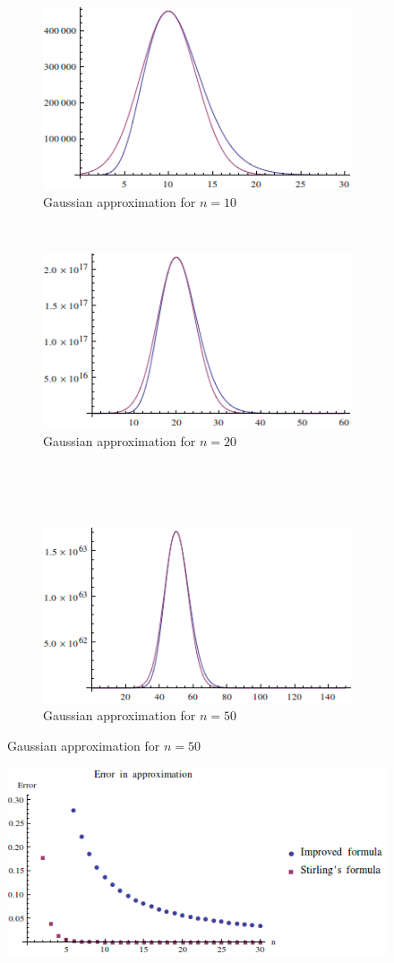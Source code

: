 \documentclass[12pt]{article}
\begin{document}
\begin{figure}[!htb]
\centering
\begin{subfigure}[b]{0.4\textwidth}
\includegraphics[scale=0.5]{gaus10}
\caption{Gaussian approximation  for $n=10$}
\end{subfigure}
~~~
\begin{subfigure}[b]{0.4\textwidth}
\includegraphics[scale=0.5]{gaus20}
\caption{Gaussian approximation  for $n=20$}
\end{subfigure}
\\~\\~
\begin{subfigure}[b]{0.4\textwidth}
\includegraphics[scale=0.5]{gaus50}
\caption{Gaussian approximation for $n=50$}
\end{subfigure}
\end{figure}
\begin{figure}[!htb]
\centering
\includegraphics[scale=0.5]{error}
\end{figure}
\newpage
\end{document}
